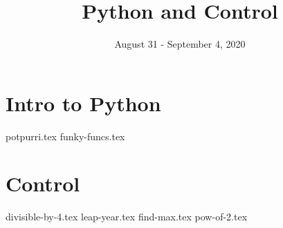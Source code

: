 \documentclass{exam}
\title{Python and Control}
\date{August 31 - September 4, 2020}
\begin{document}
\maketitle

\section{Intro to Python}
\begin{questions}
{potpurri.tex}
{funky-funcs.tex}
\end{questions}

\section{Control}
\begin{questions}
{divisible-by-4.tex}
{leap-year.tex}
{find-max.tex}
{pow-of-2.tex}
\end{questions}
\end{document}
